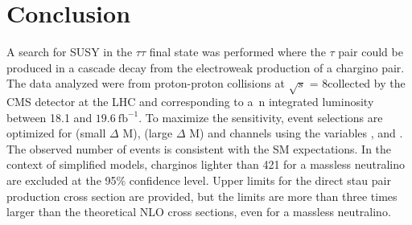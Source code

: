 \section{Conclusion}
\label{sect:conclusion}
A search for SUSY in the $\tau\tau$ final state was performed where the
$\tau$ pair could be produced in a cascade decay from the electroweak production of a chargino pair.  The data analyzed were from proton-proton collisions
at $\sqrt{s}$ = 8\TeV collected by the CMS detector at the LHC and corresponding to a\
n integrated luminosity between 18.1 and $19.6~\mathrm{fb}^{-1}$.%
To maximize the sensitivity, event selections are optimized for \tauTau (small $\Delta$ M), 
\tauTau (large $\Delta$ M) and \leptonTau channels using the variables \mttwo, \tauMT and \SumMT.
The observed number of events is consistent with the SM expectations. 
In the context of simplified models, charginos lighter than 421\GeV 
for a massless neutralino  are excluded at the 95\% confidence level.
Upper limits for the direct stau pair production cross section are provided, but the limits are more than three times
larger than the theoretical NLO cross sections, 
even for a massless neutralino.

